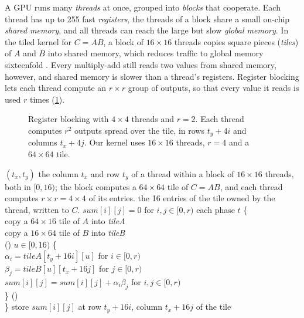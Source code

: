 A GPU runs many \emph{threads} at once, grouped into \emph{blocks} that
cooperate. Each thread has up to 255 fast \emph{registers}, the threads of
a block share a small on-chip \emph{shared memory}, and all threads can reach
the large but slow \emph{global memory}. In the tiled kernel for $C = AB$, a
block of $16 \times 16$ threads copies square pieces (\emph{tiles}) of $A$ and
$B$ into shared memory, which reduces traffic to global memory sixteenfold
\cite{pathak2026tiled,kirk2022programming}. Every multiply-add still reads two
values from shared memory, however, and shared memory is slower than a
thread's registers. Register blocking \cite{volkov2008benchmarking} lets each
thread compute an $r \times r$ group of outputs, so that every value it reads is
used $r$ times (\cref{fig:blocking}).

\begin{figure}[htbp]
\centering

\caption{Register blocking with $4 \times 4$ threads and $r = 2$. Each thread
computes $r^2$ outputs spread over the tile, in rows $t_y + 4i$ and columns
$t_x + 4j$. Our kernel uses $16 \times 16$ threads, $r = 4$ and a $64 \times 64$
tile.}
\label{fig:blocking}
\end{figure}

\begin{procedure}{$(t_x, t_y)$}
{the column $t_x$ and row $t_y$ of a thread within a block of $16 \times 16$
threads, both in $[0, 16)$; the block computes a $64 \times 64$ tile of
$C = AB$, and each thread computes $r \times r = 4 \times 4$ of its entries.}
{the 16 entries of the tile owned by the thread, written to $C$.}
\li $\mathit{sum}[i][j] = 0$ for $i, j \in [0, r)$ \groupend
\li {} each phase $t$ \{ \\
\li \> copy a $64 \times 16$ tile of $A$ into \textit{tileA} \\
\li \> copy a $16 \times 64$ tile of $B$ into \textit{tileB} \\
\li \> () \groupend
\li \>  $u \in [0, 16)$ \{ \\
\li \> \> $\alpha_i = \mathit{tileA}[t_y + 16i][u]$ for $i \in [0, r)$ \\
\li \> \> $\beta_j = \mathit{tileB}[u][t_x + 16j]$ for $j \in [0, r)$ \\
\li \> \> $\mathit{sum}[i][j] = \mathit{sum}[i][j] + \alpha_i \beta_j$ for $i, j \in [0, r)$ \\
\li \> \} \groupend
\li \> () \\
\li \} \groupend
\li store $\mathit{sum}[i][j]$ at row $t_y + 16i$, column $t_x + 16j$ of the tile
\end{procedure}

